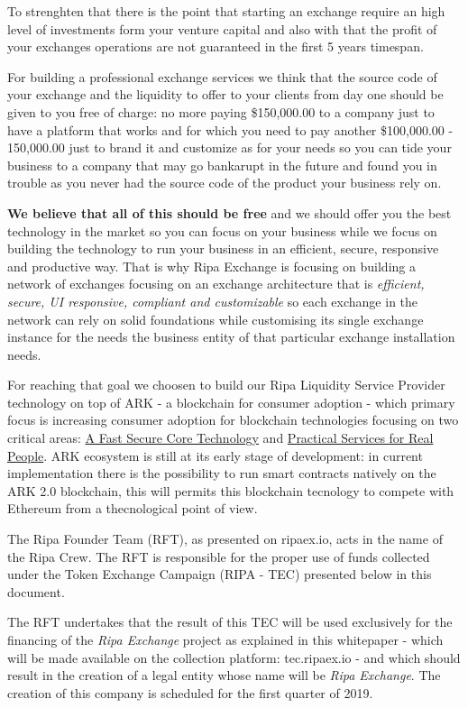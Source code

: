 \documentclass[11pt,fleqn,oneside]{book} %
\begin{document}
To strenghten that there is the point that starting an exchange require an high level of investments form your venture capital 
and also with that the profit of your exchanges operations are not guaranteed in the first 5 years timespan.

For building a professional exchange services we think that the source code of your exchange and the liquidity to offer to your clients
from day one should be given to you free of charge: no more paying \$150,000.00 to a company just to have a platform that works and for
which you need to pay another \$100,000.00 - 150,000.00 just to brand it and customize as for your needs so you can tide your 
business to a company that may go bankarupt in the future and found you in trouble as you never had the source code of the product
your business rely on.

\textbf{We believe that all of this should be free} and we should offer you the best technology in the market so you can focus on your business
while we focus on building the technology to run your business in an efficient, secure, responsive and productive way. That is why Ripa Exchange 
is focusing on building a network of exchanges focusing on an exchange architecture that is \textit{efficient, secure, UI responsive, compliant and customizable}
so each exchange in the network can rely on solid foundations while customising its single exchange instance for the needs 
the business entity of that particular exchange installation needs.

For reaching that goal we choosen to build our Ripa Liquidity Service Provider technology on top of ARK - a blockchain for consumer adoption - 
which primary focus is increasing consumer adoption for blockchain technologies focusing on two critical areas: \underline{A Fast Secure Core Technology}
and \underline{Practical Services for Real People}. ARK ecosystem is still at its early stage of development: in current implementation 
there is the possibility to run smart contracts natively on the ARK 2.0 blockchain, this will permits this blockchain tecnology to compete 
with Ethereum from a thecnological point of view.

The Ripa Founder Team (RFT), as presented on ripaex.io, acts in the name of the Ripa Crew. The RFT is responsible for the proper use of 
funds collected under the Token Exchange Campaign (RIPA - TEC) presented below in this document.

The RFT undertakes that the result of this TEC will be used exclusively for the financing of the \emph{Ripa Exchange} project as explained in this 
whitepaper - which will be made available on the collection platform: tec.ripaex.io - and which should result in the creation of a 
legal entity whose name will be \emph{Ripa Exchange}. The creation of this company is scheduled for the first quarter of 2019.
\end{document}
